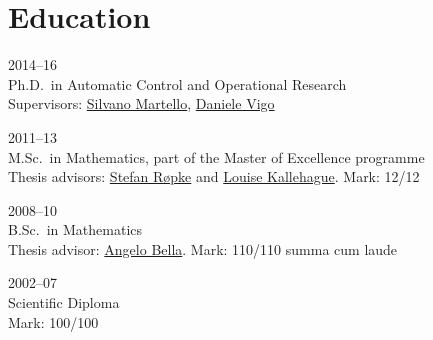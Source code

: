 \section*{Education}

\begin{paracol}{2}
  2014--16
\switchcolumn
  \\
  Ph.D.\ in Automatic Control and Operational Research\\
  Supervisors: \href{https://scholar.google.com/citations?user=o4a20zsAAAAJ}{Silvano Martello}, \href{https://scholar.google.com/citations?user=2kk8d_AAAAAJ}{Daniele Vigo}
\end{paracol}

\begin{paracol}{2}
  2011--13
\switchcolumn
  \\
  M.Sc.\ in Mathematics, part of the Master of Excellence programme\\
  Thesis advisors: \href{https://scholar.google.it/citations?user=sYi141QAAAAJ}{Stefan Røpke} and \href{http://orbit.dtu.dk/en/persons/louise-sibbesen-kallehauge(82eba7e1-4534-4eb7-adf0-c08d856235c5).html}{Louise Kallehague}. Mark: 12/12
\end{paracol}

\begin{paracol}{2}
  2008--10
\switchcolumn
  \\
  B.Sc.\ in Mathematics\\
  Thesis advisor: \href{http://ws1.unict.it/paginadocente/uploads/cit_c34b58e1bdd176c741004d830c9cf271.pdf}{Angelo Bella}. Mark: 110/110 summa cum laude
\end{paracol}

\begin{paracol}{2}
  2002--07
\switchcolumn
  \\
  Scientific Diploma\\
  Mark: 100/100
\end{paracol}
